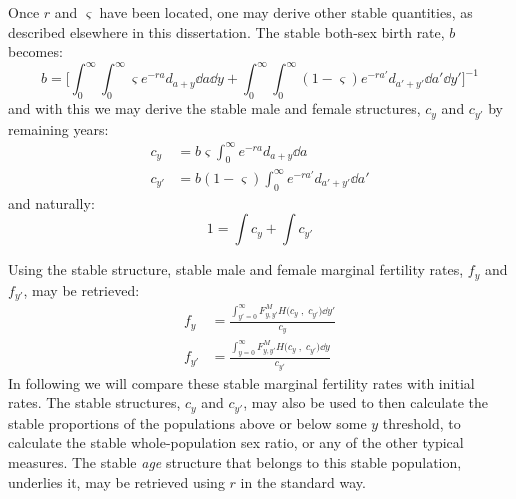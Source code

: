 \FloatBarrier
Once $r$ and $\varsigma$ have been located, one may derive other stable
quantities, as described elsewhere in this dissertation. The stable both-sex
birth rate, $b$ becomes:
\begin{equation}
b = \Bigg[\int_0^\infty  \int _0^\infty \varsigma
 e^{-ra}d_{a+y}\dd a \dd y + \int_0^\infty \int _0^\infty (1-\varsigma)
 e^{-ra'}d_{a'+y'} \dd a' \dd y' \Bigg] ^{-1}
\end{equation}
and with this we may derive the stable male and female structures, $c_y$ and
$c_{y'}$ by remaining years:
\begin{align}
\label{eq:schoenexcy}
c_y &= b\varsigma \int _0^\infty e^{-ra}d_{a+y}\dd a \\
c_{y'} &= b(1-\varsigma) \int _0^\infty e^{-ra'}d_{a'+y'}\dd a'
\end{align}
and naturally:
\begin{equation}
1 = \int c_y + \int c_{y'}
\end{equation}

Using the stable structure, stable male and female marginal fertility rates,
$f_y$ and $f_{y'}$, may be retrieved:
\begin{align}
  f_y &=  \frac{\int_{y'=0}^\infty F_{y,y'}^M H\Big(c_y\;,\; c_{y'}\Big)
  \dd y'}{c_y} \\
  f_{y'} &=  \frac{\int_{y=0}^\infty F_{y,y'}^M H\Big(c_y\;,\; c_{y'}\Big)
  \dd y}{c_{y'}} 
\end{align}
In following we will compare these stable marginal fertility rates with initial
rates. The stable structures, $c_y$ and $c_{y'}$, may also be used to then
calculate the stable proportions of the populations above or below some $y$ threshold, to calculate the stable
whole-population sex ratio, or any of the other typical measures. The stable
\textit{age} structure that belongs to this stable population, underlies it, may
be retrieved using $r$ in the standard way.

\FloatBarrier
